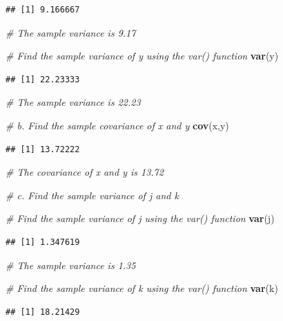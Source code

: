 \documentclass[]{article}
\newenvironment{Shaded}{\begin{snugshade}}{\end{snugshade}}
\newcommand{\KeywordTok}[1]{\textcolor[rgb]{0.13,0.29,0.53}{\textbf{#1}}}
\newcommand{\CommentTok}[1]{\textcolor[rgb]{0.56,0.35,0.01}{\textit{#1}}}
\newcommand{\NormalTok}[1]{#1}
\begin{document}
\begin{verbatim}
## [1] 9.166667
\end{verbatim}

\begin{Shaded}
\begin{Highlighting}[]
\CommentTok{# The sample variance is 9.17}

\CommentTok{# Find the sample variance of y using the var() function}
\KeywordTok{var}\NormalTok{(y)}
\end{Highlighting}
\end{Shaded}

\begin{verbatim}
## [1] 22.23333
\end{verbatim}

\begin{Shaded}
\begin{Highlighting}[]
\CommentTok{# The sample variance is 22.23}

\CommentTok{# b. Find the sample covariance of x and y}
\KeywordTok{cov}\NormalTok{(x,y)}
\end{Highlighting}
\end{Shaded}

\begin{verbatim}
## [1] 13.72222
\end{verbatim}

\begin{Shaded}
\begin{Highlighting}[]
\CommentTok{# The covariance of x and y is 13.72}

\CommentTok{# c. Find the sample variance of j and k}

\CommentTok{# Find the sample variance of j using the var() function}
\KeywordTok{var}\NormalTok{(j)}
\end{Highlighting}
\end{Shaded}

\begin{verbatim}
## [1] 1.347619
\end{verbatim}

\begin{Shaded}
\begin{Highlighting}[]
\CommentTok{# The sample variance is 1.35}

\CommentTok{# Find the sample variance of k using the var() function}
\KeywordTok{var}\NormalTok{(k)}
\end{Highlighting}
\end{Shaded}

\begin{verbatim}
## [1] 18.21429
\end{verbatim}
\end{document}

